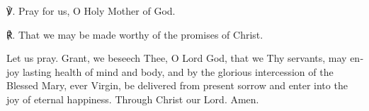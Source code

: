 \begin{otherlanguage}{english}℣. Pray for us, O Holy Mother of God.

℟. That we may be made worthy of the promises of Christ.

Let us pray. Grant, we beseech Thee, O Lord God, that we Thy servants, may enjoy lasting health of mind and body, and by the glorious intercession of the Blessed Mary, ever Virgin, be delivered from present sorrow and enter into the joy of eternal happiness. Through Christ our Lord. Amen. \end{otherlanguage}